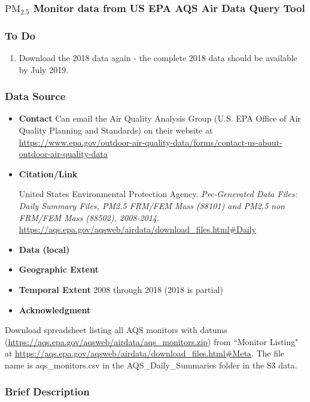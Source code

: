 \subsubsection{$\textrm{PM}_{2.5}$ Monitor data from US EPA AQS Air Data Query Tool}

\subsubsection*{To Do}
\begin{enumerate}
	\item Download the 2018 data again - the complete 2018 data should be available by July 2019.
\end{enumerate}

\subsubsection*{Data Source}

\begin{itemize}[nolistsep]
\item \textbf{Contact} Can email the Air Quality Analysis Group (U.S. EPA Office of Air Quality Planning and Standards) on their website at \url{https://www.epa.gov/outdoor-air-quality-data/forms/contact-us-about-outdoor-air-quality-data}


\item \textbf{Citation/Link}

United States Environmental Protection Agency. \textit{Pre-Generated Data Files: Daily Summary Files, PM2.5 FRM/FEM Mass (88101) and PM2.5 non FRM/FEM Mass (88502), 2008-2014}. \url{https://aqs.epa.gov/aqsweb/airdata/download_files.html#Daily} 
\item \textbf{Data (local)}
\item \textbf{Geographic Extent}
\item \textbf{Temporal Extent}
2008 through 2018 (2018 is partial)
\item \textbf{Acknowledgment}
\end{itemize}

Download spreadsheet listing all AQS monitors with datums (\url{https://aqs.epa.gov/aqsweb/airdata/aqs_monitors.zip}) from ``Monitor Listing" at \url{https://aqs.epa.gov/aqsweb/airdata/download_files.html#Meta}. The file name is aqs\_monitors.csv in the AQS\_Daily\_Summaries folder in the S3 data.

\subsubsection*{Brief Description}

